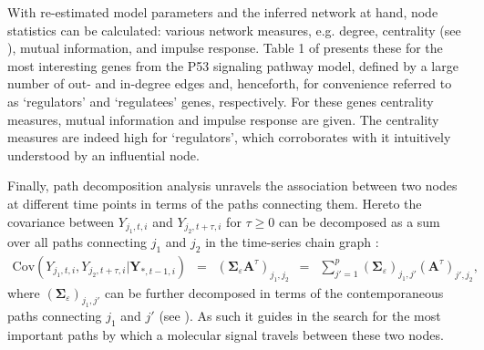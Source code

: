 With re-estimated model parameters and the inferred network at hand, node statistics can be calculated: various network measures, e.g. degree, centrality (see \cite{Newman2010}), mutual information, and impulse response. Table 1 of \cite{Miok2017} presents these for the most interesting genes from the P53 signaling pathway model, defined by a large number of out- and in-degree edges and, henceforth, for convenience referred to as `regulators' and `regulatees' genes, respectively. For these genes centrality measures, mutual information and impulse response are given. The centrality measures are indeed high for `regulators', which corroborates with it intuitively understood by an influential node.

Finally, path decomposition analysis unravels the association between two nodes at different time points in terms of the paths connecting them. Hereto the covariance between $Y_{j_1,t,i}$ and $Y_{j_2,t+\tau,i}$ for $\tau\ge 0$ can be decomposed as a sum over all paths connecting $j_1$ and $j_2$ in the time-series chain graph \citep{Miok2017}:
\begin{eqnarray*}
\mbox{Cov}(Y_{j_1,t,i},Y_{j_2,t+\tau,i}|\mathbf{Y}_{*,t-1,i}) \, \, \, = \, \, \, (\mathbf{\Sigma}_{\varepsilon} \mathbf{A}^{\tau})_{j_1,j_2}\, \, \, = \, \, \,\sum_{j'=1}^p (\mathbf{\Sigma}_{\varepsilon})_{j_1,j'} (\mathbf{A}^{\tau})_{j',j_2},
\end{eqnarray*}
where $(\mathbf{\Sigma}_{\varepsilon})_{j_1,j'}$ can be further decomposed in terms of the contemporaneous paths connecting $j_1$ and $j'$ (see \cite{Jones2005}). As such it guides in the search for the most important paths by which a molecular signal travels between these two nodes. 


